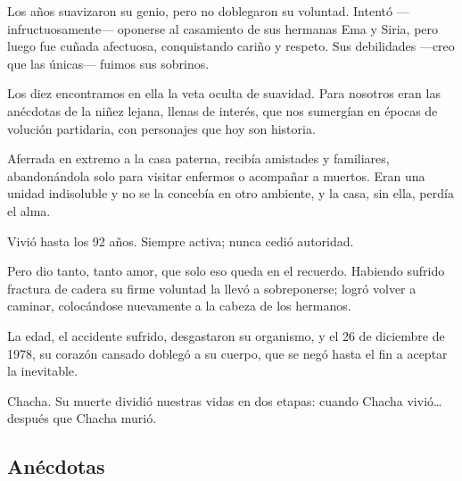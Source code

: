 \documentclass[a4paper]{article}
\begin{document}
Los años suavizaron su genio, pero no doblegaron su voluntad. Intentó ---infructuosamente--- oponerse al casamiento de sus hermanas Ema y Siria, pero luego fue cuñada afectuosa, conquistando cariño y respeto. Sus debilidades ---creo que las únicas--- fuimos sus sobrinos.

Los diez encontramos en ella la veta oculta de suavidad. Para nosotros eran las anécdotas de la niñez lejana, llenas de interés, que nos sumergían en épocas de volución partidaria, con personajes que hoy son historia.

Aferrada en extremo a la casa paterna, recibía amistades y familiares, abandonándola solo para visitar enfermos o acompañar a muertos. Eran una unidad indisoluble y no se la concebía en otro ambiente, y la casa, sin ella, perdía el alma.

Vivió hasta los 92 años. Siempre activa; nunca cedió autoridad.

Pero dio tanto, tanto amor, que solo eso queda en el recuerdo. Habiendo sufrido fractura de cadera su firme voluntad la llevó a sobreponerse; logró volver a caminar, colocándose nuevamente a la cabeza de los hermanos.

La edad, el accidente sufrido, desgastaron su organismo, y el 26 de diciembre de 1978, su corazón cansado doblegó a su cuerpo, que se negó hasta el fin a aceptar la inevitable.

Chacha. Su muerte dividió nuestras vidas en dos etapas: cuando Chacha vivió\ldots después que Chacha murió.

\subsection{Anécdotas}
\end{document}
